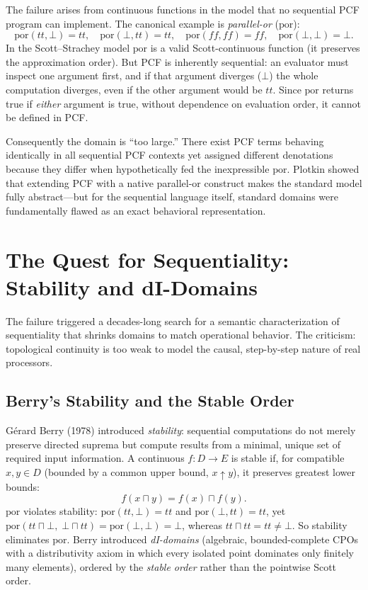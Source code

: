\documentclass[11pt]{article}
\begin{document}
The failure arises from continuous functions in the model that no sequential PCF program
can implement. The canonical example is \emph{parallel-or} ($\mathrm{por}$):
\[
  \mathrm{por}(\mathit{tt},\bot)=\mathit{tt},\quad
  \mathrm{por}(\bot,\mathit{tt})=\mathit{tt},\quad
  \mathrm{por}(\mathit{ff},\mathit{ff})=\mathit{ff},\quad
  \mathrm{por}(\bot,\bot)=\bot.
\]
In the Scott--Strachey model $\mathrm{por}$ is a valid Scott-continuous function (it
preserves the approximation order). But PCF is inherently sequential: an evaluator must
inspect one argument first, and if that argument diverges ($\bot$) the whole computation
diverges, even if the other argument would be $\mathit{tt}$. Since $\mathrm{por}$ returns
true if \emph{either} argument is true, without dependence on evaluation order, it cannot
be defined in PCF.

Consequently the domain is ``too large.'' There exist PCF terms behaving identically in
all sequential PCF contexts yet assigned different denotations because they differ when
hypothetically fed the inexpressible $\mathrm{por}$. Plotkin showed that extending PCF
with a native parallel-or construct makes the standard model fully abstract---but for the
sequential language itself, standard domains were fundamentally flawed as an exact
behavioral representation.

\section{The Quest for Sequentiality: Stability and dI-Domains}

The failure triggered a decades-long search for a semantic characterization of
sequentiality that shrinks domains to match operational behavior. The criticism:
topological continuity is too weak to model the causal, step-by-step nature of real
processors.

\subsection{Berry's Stability and the Stable Order}

G\'erard Berry (1978) introduced \emph{stability}: sequential computations do not merely
preserve directed suprema but compute results from a minimal, unique set of required
input information. A continuous $f : D \to E$ is stable if, for compatible $x,y \in D$
(bounded by a common upper bound, $x \uparrow y$), it preserves greatest lower bounds:
\[
  f(x \sqcap y) = f(x) \sqcap f(y).
\]
$\mathrm{por}$ violates stability: $\mathrm{por}(\mathit{tt},\bot)=\mathit{tt}$ and
$\mathrm{por}(\bot,\mathit{tt})=\mathit{tt}$, yet
$\mathrm{por}(\mathit{tt}\sqcap\bot,\;\bot\sqcap\mathit{tt})
 =\mathrm{por}(\bot,\bot)=\bot$, whereas
$\mathit{tt}\sqcap\mathit{tt}=\mathit{tt}\neq\bot$. So stability eliminates
$\mathrm{por}$. Berry introduced \emph{dI-domains} (algebraic, bounded-complete CPOs with
a distributivity axiom in which every isolated point dominates only finitely many
elements), ordered by the \emph{stable order} rather than the pointwise Scott order.
\end{document}
